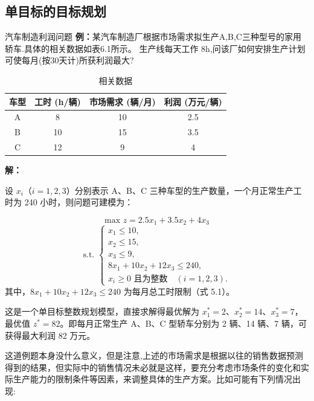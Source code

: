     \subsection{单目标的目标规划}
    \begin{exbox}{汽车制造利润问题}{}
        \textbf{例：}某汽车制造厂根据市场需求拟生产A,B,C三种型号的家用轿车.具体的相关数据如表6.1所示。
        生产线每天工作 8h,问该厂如何安排生产计划可使每月(按30天计)所获利润最大?
        \begin{table}[H]
            \centering
            \label{tab:6.1}
            \renewcommand{\arraystretch}{1.5}
            \begin{tabular}{|c|c|c|c|}
                \hline
                车型 & 工时 (h/辆) & 市场需求 (辆/月) & 利润 (万元/辆) \\ \hline
                A & 8  & 10  & 2.5  \\ \hline
                B & 10 & 15  & 3.5  \\ \hline
                C & 12 & 9   & 4    \\ \hline
            \end{tabular}
            \caption{相关数据}
        \end{table}
        \textbf{解：}
        
            设 \( x_i \)（\( i=1,2,3 \)）分别表示 A、B、C 三种车型的生产数量，一个月正常生产工时为 240 小时，则问题可建模为：
        
            \[
            \text{max } z = 2.5x_1 + 3.5x_2 + 4x_3
            \]
            \[
            \text{s.t. }
            \begin{cases} 
                x_1 \leq 10, \\ 
                x_2 \leq 15, \\ 
                x_3 \leq 9, \\ 
                8x_1 + 10x_2 + 12x_3 \leq 240, \\ 
                x_i \geq 0 \text{ 且为整数} \quad (i=1,2,3).
            \end{cases}
            \]
            其中，\( 8x_1 + 10x_2 + 12x_3 \leq 240 \) 为每月总工时限制（式 5.1）。
        
            这是一个单目标整数规划模型，直接求解得最优解为 \( x_1^* = 2 \)、\( x_2^* = 14 \)、\( x_3^* = 7 \)，最优值 \( z^* = 82 \)。即每月正常生产 A、B、C 型轿车分别为 2 辆、14 辆、7 辆，可获得最大利润 82 万元。
    \end{exbox}
    这道例题本身没什么意义，但是注意,上述的市场需求是根据以往的销售数据预测得到的结果，但实际中的销售情况未必就是这样，要充分考虑市场条件的变化和实际生产能力的限制条件等因素，来调整具体的生产方案。比如可能有下列情况出现:
